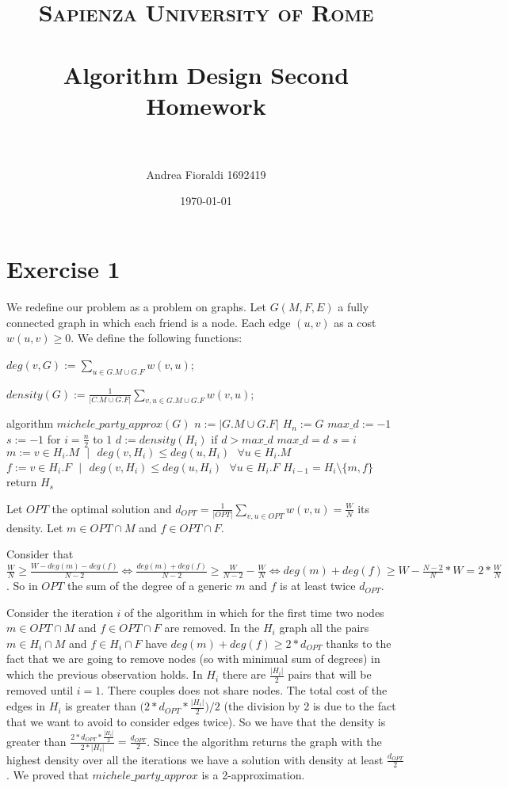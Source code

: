 \documentclass[paper=a4, fontsize=11pt]{scrartcl} %
\title{    
\normalfont \normalsize 
\textsc{Sapienza University of Rome} \\ [25pt] %
\horrule{0.5pt} \\[0.4cm] %
\huge Algorithm Design Second Homework \\ %
\horrule{2pt} \\[0.5cm] %
}
\author{Andrea Fioraldi 1692419} %
\date{\normalsize\today} %
\numberwithin{equation}{section} %
\numberwithin{figure}{section} %
\numberwithin{table}{section} %
\begin{document}
\maketitle %

\section{Exercise 1}

We redefine our problem as a problem on graphs. Let $G(M, F, E)$ a fully connected graph in which each friend is a node. Each edge $(u,v)$ as a cost $w(u,v) \geq 0$.
We define the following functions:

$deg(v, G) := \sum_{u \in G.M \cup G.F} w(v, u)$;

$density(G) := \frac{1}{|C.M \cup G.F|}\sum_{v, u \in G.M \cup G.F} w(v, u)$;

\begin{pseudo}
algorithm $michele\_party\_approx(G)$
    $n := |G.M \cup G.F|$
    $H_n := G$
    $max\_d := -1$
    $s := -1$
    for $i = \frac{n}{2}$ to $1$
        $d := density(H_i)$
        if $d > max\_d$
            $max\_d = d$
            $s = i$
        $m := v \in H_i.M\text{ }|\text{ }deg(v, H_i) \leq deg(u, H_i)\text{ }\forall u \in H_i.M$
        $f := v \in H_i.F\text{ }|\text{ }deg(v, H_i) \leq deg(u, H_i)\text{ }\forall u \in H_i.F$
        $H_{i-1} = H_i \setminus \{m, f\}$
    return $H_s$
\end{pseudo}

Let $OPT$ the optimal solution and $d_{OPT} = \frac{1}{|OPT|}\sum_{v, u \in OPT} w(v, u) = \frac{W}{N}$ its density. Let $m \in OPT \cap M$ and $f \in OPT \cap F$.

Consider that $\frac{W}{N} \geq \frac{W-deg(m)-deg(f)}{N-2} \Leftrightarrow \frac{deg(m)+deg(f)}{N-2} \geq \frac{W}{N-2} - \frac{W}{N} \Leftrightarrow deg(m)+deg(f) \geq W - \frac{N-2}{N}*W = 2*\frac{W}{N}$.
So in $OPT$ the sum of the degree of a generic $m$ and $f$ is at least twice $d_{OPT}$.

\bigskip
Consider the iteration $i$ of the algorithm in which for the first time two nodes $m \in OPT \cap M$ and $f \in OPT \cap F$ are removed. 
In the $H_i$ graph all the pairs $m \in H_i \cap M$ and $f \in H_i \cap F$ have $deg(m)+deg(f) \geq 2*d_{OPT}$ thanks to the fact that we are going to remove nodes (so with minimual sum of degrees) in which the previous observation holds.
In $H_i$ there are $\frac{|H_i|}{2}$ pairs that will be removed until $i = 1$. There couples does not share nodes. The total cost of the edges in $H_i$ is greater than $\Big(2*d_{OPT}*\frac{|H_i|}{2}\Big)/2$ (the division by 2 is due to the fact that we want to avoid to consider edges twice). So we have that the density is greater than $\frac{2*d_{OPT}*\frac{|H_i|}{2}}{2*|H_i|} = \frac{d_{OPT}}{2}$.
Since the algorithm returns the graph with the highest density over all the iterations we have a solution with density at least $\frac{d_{OPT}}{2}$.
We proved that $michele\_party\_approx$ is a 2-approximation.
\end{document}
